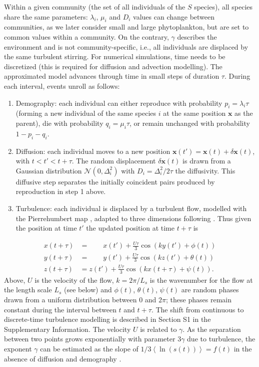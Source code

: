 \documentclass[12pt,english]{article}
\begin{document}
Within a given community (the set of all individuals of the $S$ species),
all species share the same parameters: $\lambda_{i}$, $\mu_{i}$
and $D_{i}$ values can change between communities, as we later consider
small and large phytoplankton, but are set to common values within
a community. On the contrary, $\gamma$ describes the environment
and is not community-specific, i.e., all individuals are displaced
by the same turbulent stirring. For numerical simulations, time needs
to be discretized (this is required for diffusion and advection modelling).
The approximated model advances through time in small steps of duration
$\tau$. During each interval, events unroll as follows:
\begin{enumerate}
\item Demography: each individual can either reproduce with probability
$p_{i}=\lambda_{i}\tau$ (forming a new individual of the same species
$i$ at the same position $\mathbf{x}$ as the parent), die with probability
$q_{i}=\mu_{i}\tau$, or remain unchanged with probability $1-p_{i}-q_{i}$.
\item Diffusion: each individual moves to a new position $\mathbf{x}(t')=\mathbf{x}(t)+\delta\mathbf{x}(t)$,
with $t<t'<t+\tau$. The random displacement $\delta\mathbf{x}(t)$
is drawn from a Gaussian distribution $\mathcal{N}(0,\Delta_{i}^{2})$
with $D_{i}=\Delta_{i}^{2}/2\tau$ the diffusivity. This diffusive
step separates the initially coincident pairs produced by reproduction
in step 1 above.
\item Turbulence: each individual is displaced by a turbulent flow, modelled
with the Pierrehumbert map \citep{pierrehumbert_tracer_1994}, adapted
to three dimensions following \citet{ngan_scalar_2011}. Thus given
the position at time $t'$ the updated position at time $t+\tau$
is
\end{enumerate}
\begin{equation}
\begin{array}{cc}
x(t+\tau) & =\qquad x(t')+\frac{U\tau}{3}\cos\left(ky(t')+\phi(t)\right)\\
y(t+\tau) & =\qquad y(t')+\frac{U\tau}{3}\cos\left(kz(t')+\theta(t)\right)\\
z(t+\tau) & =z(t')+\frac{U\tau}{3}\cos\left(kx(t+\tau)+\psi(t)\right).
\end{array}
\end{equation}
Above, $U$ is the velocity of the flow, $k=2\pi/L_{s}$ is the wavenumber
for the flow at the length scale $L_{s}$ (see below) and $\phi(t)$,
$\theta(t)$, $\psi(t)$ are random phases drawn from a uniform distribution
between $0$ and $2\pi$; these phases remain constant during the
interval between $t$ and $t+\tau$. The shift from continuous to
discrete-time turbulence modelling is described in Section S1 in the
Supplementary Information. The velocity $U$ is related to $\gamma$.
As the separation between two points grows exponentially with parameter
$3\gamma$ due to turbulence, the exponent $\gamma$ can be estimated
as the slope of $1/3\left\langle \ln(s(t))\right\rangle =f(t)$ in
the absence of diffusion and demography \citep{young_reproductive_2001,picoche_rescience_2022}.
\end{document}
